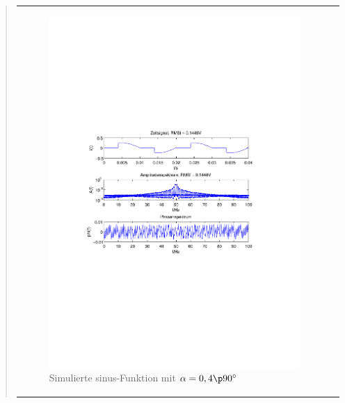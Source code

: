 \begin{quote}
\begin{center}
\begin{tabular}{ll}
        \hspace{-2.5cm}
            \begin{minipage}{0.6\textwidth}
                
                \begin{figure}[H]
                    \label{fig:sin_f-50_a-0}
                    \includegraphics[scale=0.55, trim = 35mm 100mm 35mm 95mm, clip]{Bilder/sin_f-50_a-0,4}
                    \caption{Simulierte sinus-Funktion mit $\alpha = 0,4 \p 90^\circ$}
                \end{figure}
        
            \end{minipage}
        

\end{tabular}
\end{center}
\end{quote}
